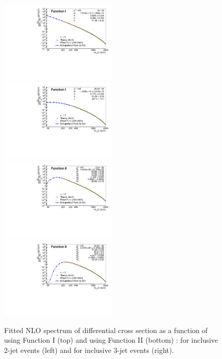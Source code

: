 \begin{figure}[!htbp]
  \begin{center}
    \includegraphics[width=0.5\textwidth]{Plots_HT_2_150/Extrapolate_Theory_2_HT_2_150_funcI.pdf}%
    \includegraphics[width=0.5\textwidth]{Plots_HT_2_150/Extrapolate_Theory_3_HT_2_150_funcI.pdf}\\
    \vspace{5mm}
    \includegraphics[width=0.5\textwidth]{Plots_HT_2_150/Extrapolate_Theory_2_HT_2_150_funcII.pdf}%
    \includegraphics[width=0.5\textwidth]{Plots_HT_2_150/Extrapolate_Theory_3_HT_2_150_funcII.pdf}\\
    \caption{Fitted NLO spectrum of differential cross section as a function of \httwo using Function I (top) and using Function II (bottom) : for inclusive 2-jet events (left) and for inclusive 3-jet events (right).}
    \label{fig:fit}
  \end{center}
\end{figure}


